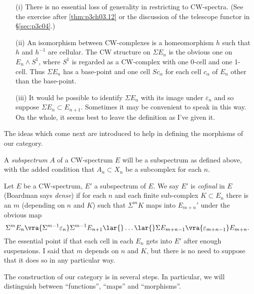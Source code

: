\documentclass[../main]{subfiles}
\begin{document}
\begin{notes}
    \begin{enumerate}
    \item[(i)]   There is no essential loss of generality in restricting to CW-spectra. (See the exercise after \ref{thm:p3ch03.12} or the discussion of the telescope functor in \S\ref{sec:p3c04}.)
    \item[(ii)]  An isomorphism between CW-complexes is a homeomorphism $h$ such that $h$ and $h^{-1}$ are cellular. The CW structure on $\Sigma   E_n$ is the obvious one on $E_n\wedge S^1$, where $S^1$ is regarded as a CW-complex with one 0-cell and one 1-cell. Thus $\Sigma   E_n$ has a base-point and one cell $Sc_\alpha$ for each cell $c_\alpha$ of $E_n$ other than the base-point.
    \item[(iii)] It would be possible to identify $\Sigma   E_n$ with its image under $\varepsilon_n$ and so suppose $\Sigma   E_n\subset E_{n+1}$. Sometimes it may be convenient to speak in this way. On the whole, it seems best to leave the definition as I've given it.
    \end{enumerate}
\end{notes}

The ideas which come next are introduced to help in defining the morphisms of our category.

A \emph{subspectrum} $A$ of a CW-spectrum $E$ will be a subspectrum as defined above, with the added condition that $A_n\subset X_n$ be a subcomplex for each $n$.

Let $E$ be a CW-spectrum, $E'$ a subspectrum of $E$. We say $E'$ is \emph{cofinal} in $E$ (Boardman says \emph{dense}) if for each $n$ and each finite sub-complex $K\subset E_n$ there is an $m$ (depending on $n$ and $K$) such that $\Sigma  ^mK$ maps into $E_{m+n}'$ under the obvious map
\[
\Sigma  ^mE_n
\vra{\Sigma  ^{m-1}\varepsilon_n}
\Sigma  ^{m-1}E_{n+1}
\lar{}
\hdots
\lar{}
\Sigma   E_{m+n-1}
\vra{\varepsilon_{m+n-1}}
E_{m+n}.
\]
The essential point if that each cell in each $E_n$ gets into $E'$ after enough suspensions. I said that $m$ depends on $n$ and $K$, but there is no need to suppose that it does so in any particular way.

The construction of our category is in several steps. In particular, we will distinguish between ``functions'', ``maps'' and ``morphisms''.
\end{document}
